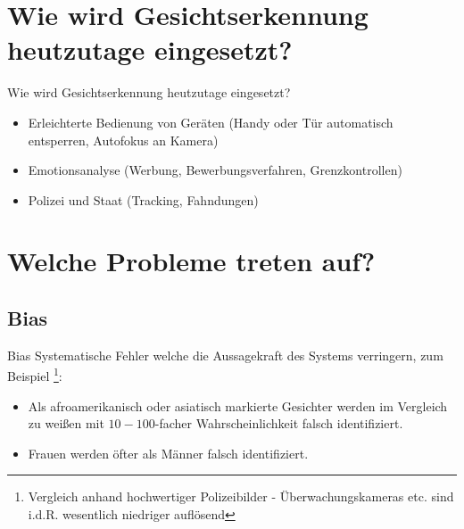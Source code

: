 \documentclass[10pt]{beamer}
\begin{document}
%

\section{Wie wird Gesichtserkennung heutzutage eingesetzt?}

\begin{frame}{Wie wird Gesichtserkennung heutzutage eingesetzt?}
  \begin{itemize}
    \item Erleichterte Bedienung von Geräten (Handy oder Tür automatisch entsperren, Autofokus an Kamera)
    \item Emotionsanalyse (Werbung, Bewerbungsverfahren, Grenzkontrollen\cite{NatureEmotions})
    \item Polizei und Staat (Tracking, Fahndungen)
  \end{itemize}
\end{frame}

\section{Welche Probleme treten auf?}

\subsection{Bias}
\begin{frame}{Bias}
  Systematische Fehler welche die Aussagekraft des Systems verringern, zum Beispiel \cite{NatureBias} \footnote{Vergleich anhand hochwertiger Polizeibilder - Überwachungskameras etc. sind i.d.R. wesentlich niedriger auflösend}:
  \begin{itemize}
    \item Als afroamerikanisch oder asiatisch markierte Gesichter werden im Vergleich zu weißen mit $10-100$-facher Wahrscheinlichkeit falsch identifiziert.
    \item Frauen werden öfter als Männer falsch identifiziert.
  \end{itemize}
\end{frame}
\end{document}

